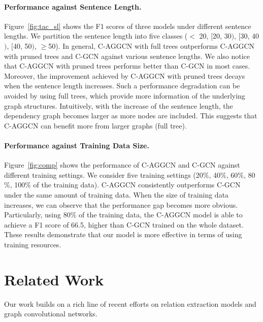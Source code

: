 \documentclass[11pt,a4paper]{article}
\begin{document}
\paragraph{Performance against Sentence Length.} Figure~\ref{fig:tac_sl} shows the F1 scores of three models  under different sentence lengths.  We partition the sentence length into five classes ($<$ 20, $[$20, 30$)$, $[$30, 40$)$, $[$40, 50$)$,  $\geq$50). In general, C-AGGCN  with full trees outperforms C-AGGCN with pruned trees and C-GCN against various sentence lengths.  We also notice that C-AGGCN with pruned trees performs better than C-GCN in most cases. Moreover, the improvement achieved by C-AGGCN with pruned trees decays when the sentence length increases. Such a performance degradation can be avoided by using full trees, which provide more information of the underlying graph structures. Intuitively, with the increase of the sentence length, the dependency graph becomes larger as more nodes are included. This suggests that C-AGGCN can benefit more  from larger graphs (full tree).



\paragraph{Performance against Training Data Size.}
Figure~\ref{fig:comp} shows the performance of C-AGGCN and C-GCN  against different training settings. We consider five training settings (20$\%$, 40$\%$, 60$\%$, 80$\%$, 100$\%$ of the training data). C-AGGCN consistently outperforms C-GCN under the same amount of training data. When the size of training data increases, we can observe that the performance gap becomes more obvious. Particularly, using 80$\%$ of the training data, the C-AGGCN model is able to achieve a F1 score of 66.5, higher than C-GCN trained on the whole dataset. These results demonstrate that our model is more effective in terms of using training resources.

\section{Related Work}
\label{sec:4}

Our work builds on a rich line of recent efforts on relation extraction models and graph convolutional networks.
\end{document}
